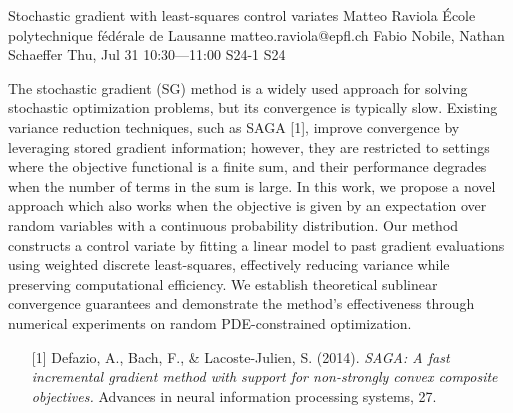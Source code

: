 \begin{talk}
  {Stochastic gradient with least-squares control variates}%
  {Matteo Raviola}%
  {\'Ecole polytechnique f\'ed\'erale de Lausanne}%
  {matteo.raviola@epfl.ch}%
  {Fabio Nobile, Nathan Schaeffer}%
  {}%
  {Thu, Jul 31 10:30---11:00}%
  {S24-1}%
  {S24}%
  
  
  
  The stochastic gradient (SG) method is a widely used approach for solving stochastic optimization problems, but its convergence is typically slow.
  Existing variance reduction techniques, such as SAGA [1], improve convergence by leveraging stored gradient information; however, they are restricted to settings where the objective functional is a finite sum, and their performance degrades when the number of terms in the sum is large.
  In this work, we propose a novel approach which also works when the objective is given by an expectation over random variables with a continuous probability distribution.
  Our method constructs a control variate by fitting a linear model to past gradient evaluations using weighted discrete least-squares, effectively reducing variance while preserving computational efficiency.
  We establish theoretical sublinear convergence guarantees and demonstrate the method's effectiveness through numerical experiments on random PDE-constrained optimization.
  
  \medskip
  
  \begin{enumerate}
    \item[{[1]}] Defazio, A., Bach, F., \& Lacoste-Julien, S. (2014). {\it SAGA: A fast incremental gradient method with support for non-strongly convex composite objectives.} Advances in neural information processing systems, 27.
  \end{enumerate}
  
\end{talk}

